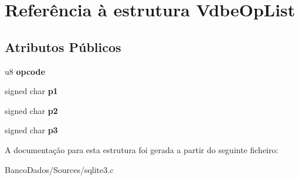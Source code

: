 \hypertarget{struct_vdbe_op_list}{\section{Referência à estrutura Vdbe\-Op\-List}
\label{struct_vdbe_op_list}
}
\subsection*{Atributos Públicos}
\begin{DoxyCompactItemize}
\item 
\hypertarget{struct_vdbe_op_list_a9c839a619aed99f91cb5e226487be7be}{u8 {\bfseries opcode}}\label{struct_vdbe_op_list_a9c839a619aed99f91cb5e226487be7be}

\item 
\hypertarget{struct_vdbe_op_list_a68641ef4313dfdfafe45b75203c49d5a}{signed char {\bfseries p1}}\label{struct_vdbe_op_list_a68641ef4313dfdfafe45b75203c49d5a}

\item 
\hypertarget{struct_vdbe_op_list_a8493431402f7f91cea81c00e311dc4e1}{signed char {\bfseries p2}}\label{struct_vdbe_op_list_a8493431402f7f91cea81c00e311dc4e1}

\item 
\hypertarget{struct_vdbe_op_list_a584cdaa02042fd5d1bc8cffbdfd9441d}{signed char {\bfseries p3}}\label{struct_vdbe_op_list_a584cdaa02042fd5d1bc8cffbdfd9441d}

\end{DoxyCompactItemize}


A documentação para esta estrutura foi gerada a partir do seguinte ficheiro\-:\begin{DoxyCompactItemize}
\item 
Banco\-Dados/\-Sources/sqlite3.\-c\end{DoxyCompactItemize}

